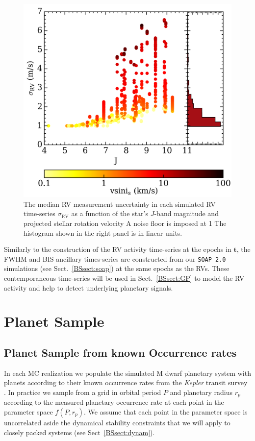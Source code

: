 \begin{figure}
  \centering
  \includegraphics[width=0.6\hsize]{figures/sigmaRV.png}%
  \caption[RV measurement uncertainty versus $J$-band magnitude and ]
      {\small The median RV measurement uncertainty in each simulated RV time-series $\sigma_{\text{RV}}$
    as a function of the star's $J$-band magnitude and projected stellar rotation velocity  A noise floor is
    imposed at 1  The histogram shown in the right panel is in linear units.}
  \label{BSfig:sigmaRV}
\end{figure}

Similarly to the construction of the RV activity time-series at the epochs in $\mathbf{t}$, the FWHM and BIS
ancillary times-series are constructed from our \texttt{SOAP 2.0} simulations (see Sect.~\ref{BSsect:soap}) 
at the same epochs as the RVs. These contemporaneous time-series will be used in Sect.~\ref{BSsect:GP} to
model the RV activity and help to detect underlying planetary signals.


\section{Planet Sample} \label{BSsect:planetsample}
\subsection{Planet Sample from known Occurrence rates}
In each MC realization we populate the simulated M dwarf planetary system with planets according to
their known occurrence rates from the \emph{Kepler} transit survey \citep{dressing15a}. In practice
we sample from a grid in orbital period $P$ and planetary radius $r_p$
according to the measured planetary occurrence rate at each point in the parameter space $f(P,r_p)$.
We assume that each point in the parameter space is
uncorrelated aside the dynamical stability constraints that we will apply to closely packed systems 
(see Sect~\ref{BSsect:dynam}). \\

